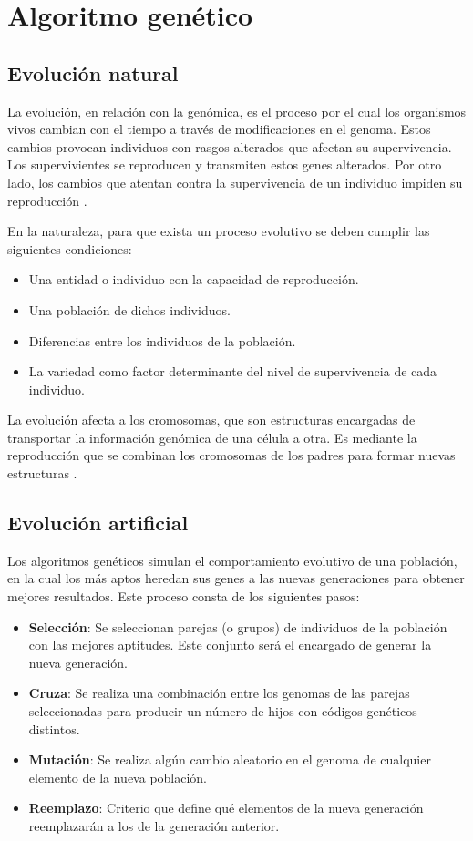 \chapter{Algoritmo genético}

\section{Evolución natural}

La evolución, en relación con la genómica, es el proceso por el cual los organismos vivos cambian con el tiempo a través de modificaciones en el genoma. Estos cambios provocan individuos con rasgos alterados que afectan su supervivencia. Los supervivientes se reproducen y transmiten estos genes alterados. Por otro lado, los cambios que atentan contra la supervivencia de un individuo impiden su reproducción \cite{evolucion}.

En la naturaleza, para que exista un proceso evolutivo se deben cumplir las siguientes condiciones:
\begin{itemize}
	\item Una entidad o individuo con la capacidad de reproducción.
	\item Una población de dichos individuos.
	\item Diferencias entre los individuos de la población.
	\item La variedad como factor determinante del nivel de supervivencia de cada individuo.
\end{itemize}

La evolución afecta a los cromosomas, que son estructuras encargadas de transportar la información genómica de una célula a otra. Es mediante la reproducción que se combinan los cromosomas de los padres para formar nuevas estructuras \cite{evolucion_2, cromosoma}.

\section{Evolución artificial}

Los algoritmos genéticos simulan el comportamiento evolutivo de una población, en la cual los más aptos heredan sus genes a las nuevas generaciones para obtener mejores resultados. Este proceso consta de los siguientes pasos:
\begin{itemize}
	\item \textbf{Selección}: Se seleccionan parejas (o grupos) de individuos de la población con las mejores aptitudes. Este conjunto será el encargado de generar la nueva generación.
	
	\item \textbf{Cruza}: Se realiza una combinación entre los genomas de las parejas seleccionadas para producir un número de hijos con códigos genéticos distintos.
	
	\item \textbf{Mutación}: Se realiza algún cambio aleatorio en el genoma de cualquier elemento de la nueva población.
	
	\item \textbf{Reemplazo}: Criterio que define qué elementos de la nueva generación reemplazarán a los de la generación anterior.
\end{itemize}

